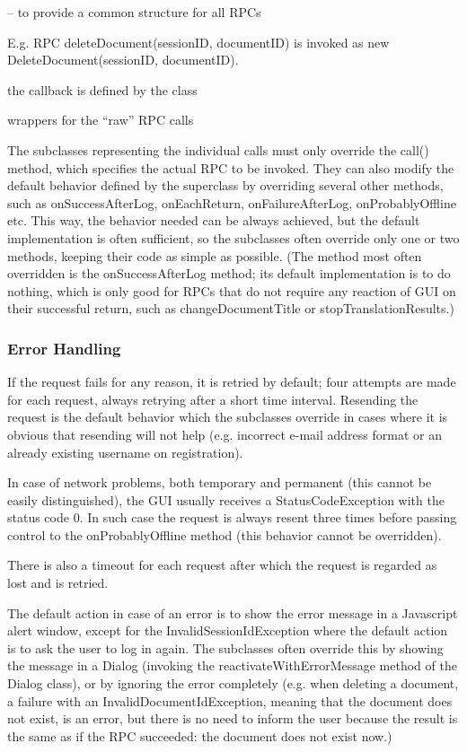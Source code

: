 -- to provide a common structure for all RPCs

E.g. RPC deleteDocument(sessionID, documentID)
is invoked as new DeleteDocument(sessionID, documentID).

the callback is defined by the class

wrappers for the ``raw'' RPC calls

The subclasses representing the individual calls must only override the call() method, which specifies the actual RPC to be invoked.
They can also modify the default behavior defined by the superclass by overriding several other methods, such as onSuccessAfterLog, onEachReturn, onFailureAfterLog, onProbablyOffline etc. This way, the behavior needed can be always achieved, but the default implementation is often sufficient, so the subclasses often override only one or two methods, keeping their code as simple as possible. (The method most often overridden is the onSuccessAfterLog method; its default implementation is to do nothing, which is only good for RPCs that do not require any reaction of GUI on their successful return, such as changeDocumentTitle or stopTranslationResults.)

\subsubsection{Error Handling}

If the request fails for any reason, it is retried by default; four attempts are made for each request, always retrying after a short time interval.
Resending the request is the default behavior which the subclasses override in cases where it is obvious that resending will not help (e.g. incorrect e-mail address format or an already existing username on registration).

In case of network problems, both temporary and permanent (this cannot be easily distinguished), the GUI usually receives a StatusCodeException with the status code 0. In such case the request is always resent three times before passing control to the onProbablyOffline method (this behavior cannot be overridden).

There is also a timeout for each request after which the request is regarded as lost and is retried.

The default action in case of an error is to show the error message in a Javascript alert window, except for the InvalidSessionIdException where the default action is to ask the user to log in again.
The subclasses often override this by showing the message in a Dialog (invoking the reactivateWithErrorMessage method of the Dialog class), or by ignoring the error completely (e.g. when deleting a document, a failure with an InvalidDocumentIdException, meaning that the document does not exist, is an error, but there is no need to inform the user because the result is the same as if the RPC succeeded: the document does not exist now.)

